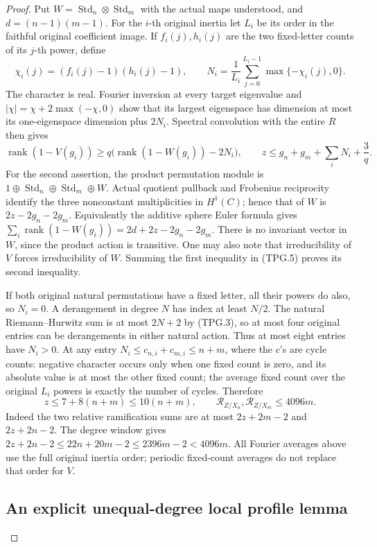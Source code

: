 \begin{proof}
Put \(W=\operatorname{Std}_n\otimes\operatorname{Std}_m\)
with the actual maps understood, and \(d=(n-1)(m-1)\).
For the \(i\)-th original inertia let \(L_i\) be its order in
the faithful original coefficient image.  If \(f_i(j),h_i(j)\)
are the two fixed-letter counts of its \(j\)-th power, define
\[
 \chi_i(j)=(f_i(j)-1)(h_i(j)-1),\qquad
 N_i=\frac1{L_i}\sum_{j=0}^{L_i-1}\max\{-\chi_i(j),0\}.
 \tag{TPG.4}
\]
The character is real.  Fourier inversion at every target eigenvalue
and \(|\chi|=\chi+2\max(-\chi,0)\) show that its largest
eigenspace has dimension at most its one-eigenspace dimension
plus \(2N_i\).  Spectral convolution with the entire \(R\)
then gives
\[
 \operatorname{rank}(1-V(g_i))
 \ge q\bigl(\operatorname{rank}(1-W(g_i))-2N_i\bigr),
 \qquad
 z\le g_n+g_m+\sum_iN_i+\frac3q.
 \tag{TPG.5}
\]
For the second assertion, the product permutation module is
\(1\oplus\operatorname{Std}_n\oplus\operatorname{Std}_m\oplus W\).
Actual quotient pullback and Frobenius reciprocity identify the
three nonconstant multiplicities in \(H^1(C)\); hence that of
\(W\) is \(2z-2g_n-2g_m\).  Equivalently the additive
sphere Euler formula gives
\(\sum_i\operatorname{rank}(1-W(g_i))
=2d+2z-2g_n-2g_m\).
There is no invariant vector in \(W\), since the product action
is transitive.  One may also note that irreducibility of \(V\)
forces irreducibility of \(W\).  Summing the first inequality
in (TPG.5) proves its second inequality.

If both original natural permutations have a fixed letter, all
their powers do also, so \(N_i=0\).  A derangement in degree
\(N\) has index at least \(N/2\).  The natural Riemann--Hurwitz
sum is at most \(2N+2\) by (TPG.3), so at most four original
entries can be derangements in either natural action.  Thus at
most eight entries have \(N_i>0\).  At any entry
\(N_i\le c_{n,i}+c_{m,i}\le n+m\), where the \(c\)'s
are cycle counts: negative character occurs only when one fixed
count is zero, and its absolute value is at most the other fixed
count; the average fixed count over the original \(L_i\) powers
is exactly the number of cycles.  Therefore
\[
 z\le7+8(n+m)\le10(n+m),\qquad
 \mathcal R_{Z/X_n},\mathcal R_{Z/X_m}\le4096m.
 \tag{TPG.6}
\]
Indeed the two relative ramification sums are at most
\(2z+2m-2\) and \(2z+2n-2\).  The degree window gives
\(2z+2n-2\le22n+20m-2\le2396m-2<4096m\).
All Fourier averages above use the full original inertia order;
periodic fixed-count averages do not replace that order for \(V\).

\subsection*{An explicit unequal-degree local profile lemma}


\end{proof}
